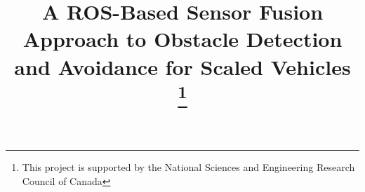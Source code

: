 \documentclass[conference]{IEEEtran}
\begin{document}
\title{A ROS-Based Sensor Fusion Approach to Obstacle Detection and Avoidance for Scaled Vehicles\\
\thanks{This project is supported by the National Sciences and Engineering Research Council of Canada}
}

\author{
 }
%
\maketitle
\end{document}
